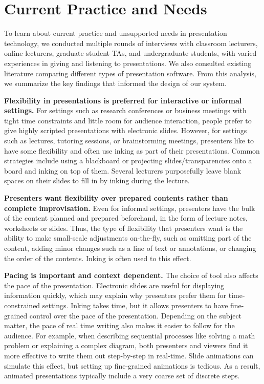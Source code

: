 \section{Current Practice and Needs}
To learn about current practice and unsupported needs in presentation technology, we conducted multiple rounds of interviews with classroom lecturers, online lecturers, graduate student TAs, and undergraduate students, with varied experiences in giving and listening to presentations. 
%
We also consulted existing literature comparing different types of presentation software.
%
From this analysis, we summarize the key findings that informed the design of our system.

\textbf{Flexibility in presentations is preferred for interactive or informal settings.} For settings such as research conferences or business meetings with tight time constraints and little room for audience interaction, people prefer to give highly scripted presentations with electronic slides. However, for settings such as lectures, tutoring sessions, or brainstorming meetings, presenters like to have some flexibility and often use inking as part of their presentations. Common strategies include using a blackboard or projecting slides/transparencies onto a board and inking on top of them. Several lecturers purposefully leave blank spaces on their slides to fill in by inking during the lecture. %

\textbf{Presenters want flexibility over prepared contents rather than complete improvisation.} Even for informal settings, presenters have the bulk of the content planned and prepared beforehand, in the form of lecture notes, worksheets or slides. Thus, the type of flexibility that presenters want is the ability to make small-scale adjustments on-the-fly, such as omitting part of the content, adding minor changes such as a line of text or annotations, or changing the order of the contents. Inking is often used to this effect. 

\textbf{Pacing is important and context dependent.} 
The choice of tool also affects the pace of the presentation. Electronic slides are useful for displaying information quickly, which may explain why presenters prefer them for time-constrained settings. Inking takes time, but it allows presenters to have fine-grained control over the pace of the presentation. Depending on the subject matter, the pace of real time writing also makes it easier to follow for the audience. For example, when describing sequential processes like solving a math problem or explaining a complex diagram, both presenters and viewers find it more effective to write them out step-by-step in real-time. Slide animations can simulate this effect, but setting up fine-grained animations is tedious. As a result, animated presentations typically include a very coarse set of discrete steps. 

